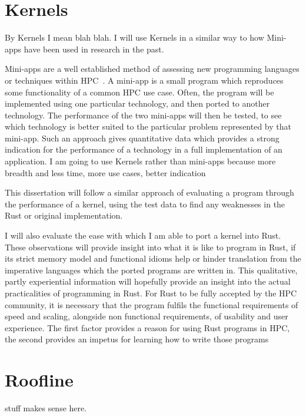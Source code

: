 \section{Kernels}
By Kernels I mean blah blah. I will use Kernels in a similar way to how Mini-apps have been used in research in the past.

Mini-apps are a well established method of assessing new programming languages or techniques within HPC~\cite{Mallinson:2014, Slaughter:2015, martineau2017arch}. A mini-app is a small program which reproduces some functionality of a common HPC use case. Often, the program will be implemented using one particular technology, and then ported to another technology. The performance of the two mini-apps will then be tested, to see which technology is better suited to the particular problem represented by that mini-app. Such an approach gives quantitative data which provides a strong indication for the performance of a technology in a full implementation of an application. I am going to use Kernels rather than mini-apps because more breadth and less time, more use cases, better indication

This dissertation will follow a similar approach of evaluating a program through the performance of a kernel, using the test data to find any weaknesses in the Rust or original implementation.

I will also evaluate the ease with which I am able to port a kernel into Rust. These observations will provide insight into what it is like to program in Rust, if its strict memory model and functional idioms help or hinder translation from the imperative languages which the ported programs are written in. This qualitative, partly experiential information will hopefully provide an insight into the actual practicalities of programming in Rust. For Rust to be fully accepted by the HPC community, it is necessary that the program fulfils the functional requirements of speed and scaling, alongside non functional requirements, of usability and user experience. The first factor provides a reason for using Rust programs in HPC, the second provides an impetus for learning how to write those programs


\section{Roofline} stuff makes sense here.
